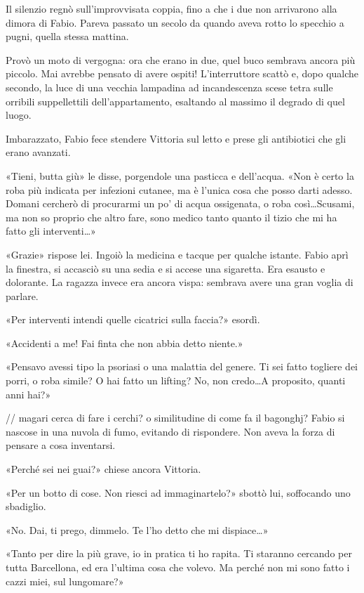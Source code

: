Il silenzio regnò sull'improvvisata coppia, fino a che i due non arrivarono alla dimora di Fabio. Pareva passato un secolo da quando aveva rotto lo specchio a pugni, quella stessa mattina.

Provò un moto di vergogna: ora che erano in due, quel buco sembrava ancora più piccolo. Mai avrebbe pensato di avere ospiti! L'interruttore scattò e, dopo qualche secondo, la luce di una vecchia lampadina ad incandescenza scese tetra sulle orribili suppellettili dell'appartamento, esaltando al massimo il degrado di quel luogo.

Imbarazzato, Fabio fece stendere Vittoria sul letto e prese gli antibiotici che gli erano avanzati.

«Tieni, butta giù» le disse, porgendole una pasticca e dell'acqua. «Non è certo la roba più indicata per infezioni cutanee, ma è l'unica cosa che posso darti adesso. Domani cercherò di procurarmi un po' di acqua ossigenata, o roba così\ldots Scusami, ma non so proprio che altro fare, sono medico tanto quanto il tizio che mi ha fatto gli interventi\ldots»

«Grazie» rispose lei. Ingoiò la medicina e tacque per qualche istante. Fabio aprì la finestra, si accasciò su una sedia e si accese una sigaretta. Era esausto e dolorante. La ragazza invece era ancora vispa: sembrava avere una gran voglia di parlare.

«Per interventi intendi quelle cicatrici sulla faccia?» esordì.

«Accidenti a me! Fai finta che non abbia detto niente.»

«Pensavo avessi tipo la psoriasi o una malattia del genere. Ti sei fatto togliere dei porri, o roba simile? O hai fatto un lifting? No, non credo\ldots A proposito, quanti anni hai?»

// magari cerca di fare i cerchi? o similitudine di come fa il bagonghj?
Fabio si nascose in una nuvola di fumo, evitando di rispondere. Non aveva la forza di pensare a cosa inventarsi.

«Perché sei nei guai?» chiese ancora Vittoria.

«Per un botto di cose. Non riesci ad immaginartelo?» sbottò lui, soffocando uno sbadiglio.

«No. Dai, ti prego, dimmelo. Te l'ho detto che mi dispiace\ldots»

«Tanto per dire la più grave, io in pratica ti ho rapita. Ti staranno cercando per tutta Barcellona, ed era l'ultima cosa che volevo. Ma perché non mi sono fatto i cazzi miei, sul lungomare?»

